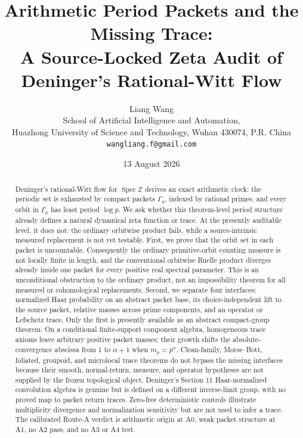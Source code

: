 \documentclass[11pt]{article}
\title{\textbf{Arithmetic Period Packets and the Missing Trace:}\\
A Source-Locked Zeta Audit of Deninger's Rational-Witt Flow}
\author{Liang Wang\\
\small School of Artificial Intelligence and Automation,\\[-2pt]
\small Huazhong University of Science and Technology, Wuhan 430074, P.R. China\\
\small \texttt{wangliang.f@gmail.com}}
\date{13 August 2026}
\theoremstyle{definition}
\theoremstyle{remark}
\newcommand{\Z}{\mathbb{Z}}
\newcommand{\Spec}{\operatorname{Spec}}
\begin{document}
\maketitle

\begin{abstract}
Deninger's rational-Witt flow for \(\Spec\Z\) derives an exact arithmetic
clock: the periodic set is exhausted by compact packets \(\Gamma_p\), indexed
by rational primes, and every orbit in \(\Gamma_p\) has least period
\(\log p\).  We ask whether this theorem-level period structure already
defines a natural dynamical zeta function or trace.  At the presently
auditable level, it does not: the ordinary orbitwise product fails, while a
source-intrinsic measured replacement is not yet testable.  First, we prove
that the orbit set in each packet is uncountable.  Consequently the
ordinary primitive-orbit counting measure is not locally finite in length, and
the conventional orbitwise Ruelle product diverges already inside one packet
for every positive real spectral parameter.  This is an unconditional
obstruction to the ordinary product, not an impossibility theorem for all
measured or cohomological replacements.  Second, we separate four interfaces:
normalized Haar probability on an abstract packet base, its
choice-independent lift to the source packet, relative masses across prime
components, and an operator or Lefschetz trace.  Only the first is presently
available as an abstract compact-group theorem.  On a conditional
finite-support component algebra, homogeneous trace axioms leave arbitrary
positive packet masses; their growth shifts the absolute-convergence abscissa
from \(1\) to \(\alpha+1\) when \(m_p\asymp p^\alpha\).  Clean-family,
Morse--Bott, foliated, groupoid, and microlocal trace theorems do not bypass
the missing interfaces because their smooth, normal-return, measure, and
operator hypotheses are not supplied by the frozen topological object.
Deninger's Section 11 Haar-normalized convolution algebra is genuine but is
defined on a different inverse-limit group, with no proved map to packet
return traces.  Zero-free deterministic controls illustrate multiplicity
divergence and normalization sensitivity but are not used to infer a trace.
The calibrated Route-A verdict is arithmetic origin at A0, weak packet
structure at A1, no A2 pass, and no A3 or A4 test.
\end{abstract}
\end{document}
